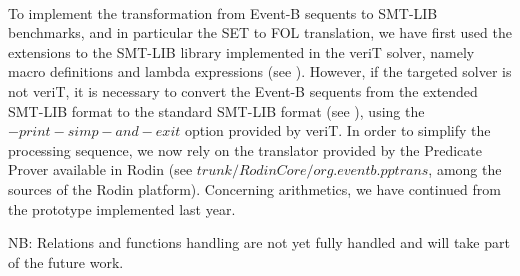 \paragraph{}
To implement the transformation from Event-B sequents to SMT-LIB benchmarks, and in particular the SET to FOL translation, we have first used the extensions to the SMT-LIB library implemented in the veriT solver, namely macro definitions and lambda expressions (see \cite{BSMT10}). However, if the targeted solver is not veriT, it is necessary to convert the Event-B sequents from the extended SMT-LIB format to the standard SMT-LIB format (see \cite{RODINSMT10}), using the $-print-simp-and-exit$ option provided by veriT.
In order to simplify the processing sequence, we now rely on the translator provided by the Predicate Prover available in Rodin (see $trunk/RodinCore/org.eventb.pptrans$, among the sources\cite{SOURCES} of the Rodin platform). 
Concerning arithmetics, we have continued from the prototype\cite{B2SMT09} implemented last year.

NB: Relations and functions handling are not yet fully handled and will take part of the future work.
